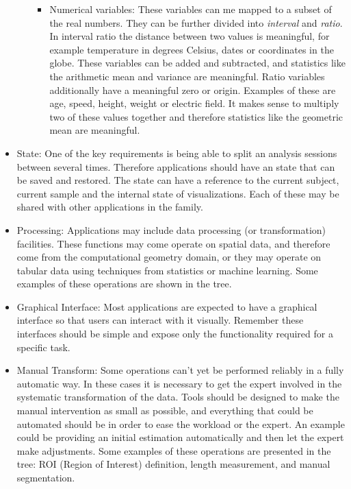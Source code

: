 \begin{itemize}
\begin{itemize}
\begin{itemize}
\item Numerical variables: These variables can me mapped to a subset of the real numbers. They can be further divided into \emph{interval} and  \emph{ratio}. In interval ratio the distance between two values is meaningful, for example temperature in degrees Celsius, dates or coordinates in the globe. These variables can be added and subtracted, and statistics like the arithmetic mean and variance are meaningful. Ratio variables additionally have a meaningful zero or origin. Examples of these are age, speed, height, weight or electric field. It makes sense to multiply two of these values together and therefore statistics like the geometric mean are meaningful.
\end{itemize}
\end{itemize}
\item State: One of the key requirements is being able to split an analysis sessions between several times. Therefore applications should have an state that can be saved and restored. The state can have a reference to the current subject, current sample and the internal state of visualizations. Each of these may be shared with other applications in the family. 
\item Processing: Applications may include data processing (or transformation) facilities. These functions may come operate on spatial data, and therefore come from the computational geometry domain, or they may operate on tabular data using techniques from statistics or machine learning. Some examples of these operations are shown in the tree.
\item Graphical Interface: Most applications are expected to have a graphical interface so that users can interact with it visually. Remember these interfaces should be simple and expose only the functionality required for a specific task.
\item  Manual Transform: Some operations can't yet be performed reliably in a fully automatic way. In these cases it is necessary to get the expert involved in the systematic transformation of the data. Tools should be designed to make the manual intervention as small as possible, and everything that could be automated should be in order to ease the workload or the expert. An example could be providing an initial estimation automatically and then let the expert make adjustments. Some examples of these operations are presented in the tree: ROI (Region of Interest) definition, length measurement, and manual segmentation.
\end{itemize}

